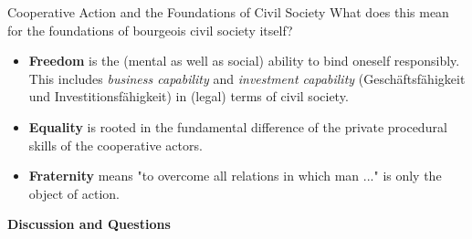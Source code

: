 \documentclass{beamer}
\begin{document}
\begin{frame}{Cooperative Action and the Foundations of Civil Society}
  What does this mean for the foundations of bourgeois civil society itself?
  \begin{itemize}
  \item \textbf{Freedom} is the (mental as well as social) ability to bind
    oneself responsibly. This includes \emph{business capability} and
    \emph{investment capability} (Geschäftsfähigkeit und
    Investitionsfähigkeit) in (legal) terms of civil society.
  \item \textbf{Equality} is rooted in the fundamental difference of the
    private procedural skills of the cooperative actors.
  \item \textbf{Fraternity} means "to overcome all relations in which man
    ..." is only the object of action.
  \end{itemize}\vfill
  
  \begin{center}\large\bf Discussion and Questions  \end{center}
\end{frame}
\end{document}
